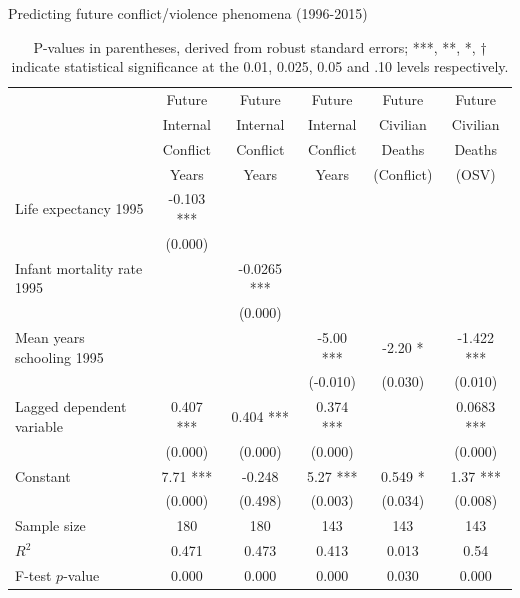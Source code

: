 \documentclass[12pt]{article}
\begin{document}
\begin{table}[!htbp]
\small
\centering
\caption{Predicting future conflict/violence phenomena (1996-2015)}
\label{table_violence}
\begin{tabular}{lccccc}
\toprule
                               & Future          & Future          & Future      & Future     & Future \\
                               & Internal        & Internal        & Internal    & Civilian   & Civilian \\
                               & Conflict        & Conflict        & Conflict    & Deaths     & Deaths\\
                               & Years           & Years           & Years       & (Conflict) & (OSV) \\
\midrule
Life expectancy 1995           & -0.103 ***      &                 &             &            & \\
                               & (0.000)         &                 &             &            & \\
Infant mortality rate 1995     &                 & -0.0265 ***     &             &            & \\
                               &                 & (0.000)         &             &            & \\
Mean years schooling 1995      &                 &                 & -5.00 ***   & -2.20 *    & -1.422 *** \\
                               &                 &                 & (-0.010)    & (0.030)    & (0.010) \\
Lagged dependent variable      & 0.407 ***       & 0.404 ***       & 0.374 ***   &            & 0.0683 *** \\
                               & (0.000)         & (0.000)         & (0.000)     &            & (0.000) \\
Constant                       & 7.71 ***        & -0.248          & 5.27 ***    & 0.549 *    & 1.37 *** \\
                               & (0.000)         & (0.498)         & (0.003)     & (0.034)    & (0.008) \\
\midrule
Sample size                    & 180             & 180             & 143         & 143        & 143 \\
$R^2$                          & 0.471           & 0.473           & 0.413       & 0.013      & 0.54 \\
F-test $p$-value               & 0.000           & 0.000           & 0.000       & 0.030      & 0.000 \\
\bottomrule
\end{tabular}
\caption*{P-values in parentheses, derived from robust standard errors; ***, **, *, † indicate statistical significance at the 0.01, 0.025, 0.05 and .10 levels respectively.}
\end{table}
\end{document}
